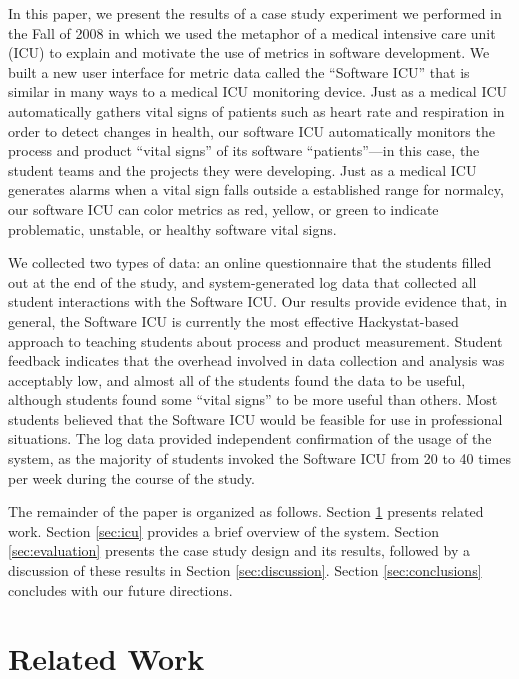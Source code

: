 \documentclass{acm_proc_article-sp}
\begin{document}
In this paper, we present the results of a case study experiment we
performed in the Fall of 2008 in which we used the metaphor of a medical
intensive care unit (ICU) to explain and motivate the use of metrics in
software development.  We built a new user interface for metric data called
the ``Software ICU'' that is similar in many ways to a medical ICU
monitoring device.  Just as a medical ICU automatically gathers vital signs
of patients such as heart rate and respiration in order to detect changes
in health, our software ICU automatically monitors the process and product
``vital signs'' of its software ``patients''---in this case, the student
teams and the projects they were developing.  Just as a medical ICU
generates alarms when a vital sign falls outside a established range for
normalcy, our software ICU can color metrics as red, yellow, or green to
indicate problematic, unstable, or healthy software vital signs. 

We collected two types of data: an online questionnaire that the students
filled out at the end of the study, and system-generated log data that
collected all student interactions with the Software ICU.  Our results
provide evidence that, in general, the Software ICU is currently the most
effective Hackystat-based approach to teaching students about process and
product measurement.  Student feedback indicates that the overhead involved
in data collection and analysis was acceptably low, and almost all of the
students found the data to be useful, although students found some ``vital
signs'' to be more useful than others. Most students believed that the
Software ICU would be feasible for use in professional situations.  The log
data provided independent confirmation of the usage of the system, as the
majority of students invoked the Software ICU from 20 to 40 times per week
during the course of the study.

The remainder of the paper is organized as follows.  Section
\ref{sec:related} presents related work.  Section \ref{sec:icu} provides a
brief overview of the system. Section \ref{sec:evaluation} presents the
case study design and its results, followed by a discussion of these results
in Section \ref{sec:discussion}.   Section \ref{sec:conclusions} concludes with 
our future directions.

\section {Related Work}
\label{sec:related}
\end{document}
